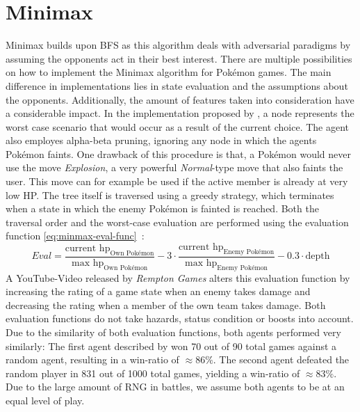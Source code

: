 \section{Minimax}
\label{sec:related-minimax}
Minimax builds upon \ac{BFS} as this algorithm deals with adversarial paradigms by assuming the opponents 
act in their best interest.
There are multiple possibilities on how to implement the Minimax algorithm for Pokémon games. The main difference 
in implementations lies in state evaluation and the assumptions about the opponents. Additionally,
the amount of features taken into consideration have a considerable impact. In the implementation proposed by
\cite{Lee_Togelius_2017}, a node represents the worst case scenario that would occur as a result of the current choice. 
The agent also employes alpha-beta pruning, ignoring any node in which the agents Pokémon faints. 
One drawback of this procedure is that, a Pokémon would never use the move \textit{Explosion},
a very powerful \textit{Normal}-type move that also faints the user. This move can for example be used if
the active member is already at very low \ac{HP}.
The tree itself is traversed using a greedy strategy, which terminates when a state in which the enemy 
Pokémon is fainted is reached. Both the traversal order and the worst-case evaluation are performed using
the evaluation function \ref{eq:minmax-eval-func}~\autocite{Lee_Togelius_2017}:
\begin{equation}
\label{eq:minmax-eval-func}
    Eval = \frac{\text{current hp}_{\text{Own Pokémon}}}{\text{max hp}_{\text{Own Pokémon}}} -
    3 \cdot \frac{\text{current hp}_{\text{Enemy Pokémon}}}{\text{max hp}_{\text{Enemy Pokémon}}} -
    0.3 \cdot \text{depth}
\end{equation}
A YouTube-Video released by \emph{Rempton Games} \cite{RemptonGames:PokemonAI}  
alters this evaluation function
by increasing the rating of a game state when an enemy takes damage and decreasing the rating when a member
of the own team takes damage. Both evaluation functions do not take hazards, status condition or boosts 
into account. Due to the similarity of both evaluation functions, both agents performed very similarly:
The first agent described by \cite{Lee_Togelius_2017} won 70 out of 90 total games against a random agent,
resulting in a win-ratio of $\approx 86\%$. The second agent defeated the random player in 831 out of 1000
total games, yielding a win-ratio of $\approx 83\%$. Due to the large amount of \ac{RNG} in battles, we assume
both agents to be at an equal level of play. \\
